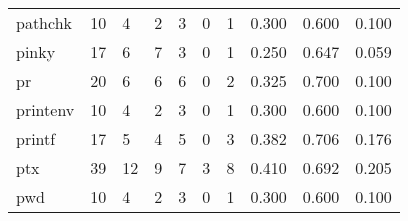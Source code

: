 \begin{longtable}{lp{1.3cm}p{1.3cm}p{1.3cm}p{1.3cm}p{1.3cm}p{1.3cm}p{1.3cm}p{1.3cm}p{1.3cm}}
pathchk   &                     10 &                                             4 &                                            2 &                                           3 &                                            0 &                                          1 &                                0.300 &                                  0.600 &                                0.100 \\
pinky     &                     17 &                                             6 &                                            7 &                                           3 &                                            0 &                                          1 &                                0.250 &                                  0.647 &                                0.059 \\
pr        &                     20 &                                             6 &                                            6 &                                           6 &                                            0 &                                          2 &                                0.325 &                                  0.700 &                                0.100 \\
printenv  &                     10 &                                             4 &                                            2 &                                           3 &                                            0 &                                          1 &                                0.300 &                                  0.600 &                                0.100 \\
printf    &                     17 &                                             5 &                                            4 &                                           5 &                                            0 &                                          3 &                                0.382 &                                  0.706 &                                0.176 \\
ptx       &                     39 &                                            12 &                                            9 &                                           7 &                                            3 &                                          8 &                                0.410 &                                  0.692 &                                0.205 \\
pwd       &                     10 &                                             4 &                                            2 &                                           3 &                                            0 &                                          1 &                                0.300 &                                  0.600 &                                0.100 \\

\end{longtable}
